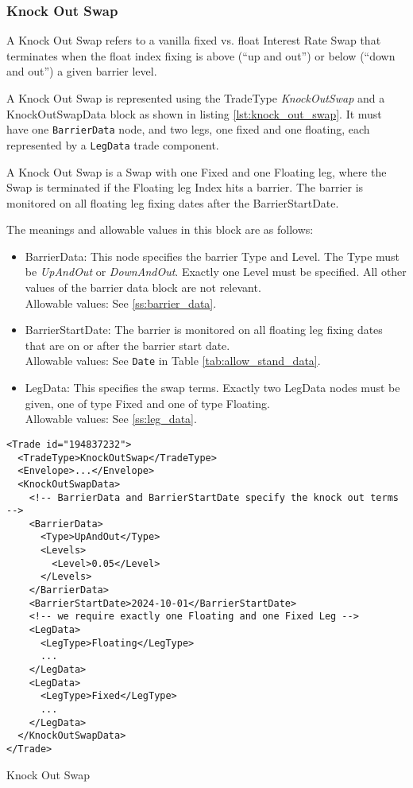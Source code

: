 \subsubsection{Knock Out Swap}

A Knock Out Swap refers to a vanilla fixed vs. float Interest Rate Swap that terminates when the float index fixing is above
(``up and out'') or below (``down and out'') a given barrier level.

A Knock Out Swap is represented using the TradeType \emph{KnockOutSwap} and a KnockOutSwapData block as shown in listing
\ref{lst:knock_out_swap}. It must have one \lstinline!BarrierData! node, and two legs, one fixed and one floating, each represented by a \lstinline!LegData! trade component. 

A Knock Out Swap is a Swap with one Fixed and one Floating leg, where the Swap is terminated if the Floating leg Index hits a barrier. The barrier is monitored on all floating leg fixing dates after the BarrierStartDate.

The meanings and allowable values in this block are as follows:

\begin{itemize}
\item BarrierData: This node specifies the barrier Type and Level. The Type must be \emph{UpAndOut} or
  \emph{DownAndOut}. Exactly one Level must be specified. All other values of the barrier data block are not relevant. \\
  Allowable values: See \ref{ss:barrier_data}.

\item BarrierStartDate: The barrier is monitored on all floating leg fixing dates that are on or after the barrier start date. \\
  Allowable values: See \lstinline!Date! in Table \ref{tab:allow_stand_data}.

\item LegData: This specifies the swap terms. Exactly two LegData nodes must be given, one of type Fixed and one of type Floating. \\
    Allowable values: See \ref{ss:leg_data}.
\end{itemize}

\begin{listing}[hbt]
\begin{verbatim}
<Trade id="194837232">
  <TradeType>KnockOutSwap</TradeType>
  <Envelope>...</Envelope>
  <KnockOutSwapData>
    <!-- BarrierData and BarrierStartDate specify the knock out terms -->
    <BarrierData>
      <Type>UpAndOut</Type>
      <Levels>
        <Level>0.05</Level>
      </Levels>
    </BarrierData>
    <BarrierStartDate>2024-10-01</BarrierStartDate>
    <!-- we require exactly one Floating and one Fixed Leg -->
    <LegData>
      <LegType>Floating</LegType>
      ...
    </LegData>
    <LegData>
      <LegType>Fixed</LegType>
      ...
    </LegData>
  </KnockOutSwapData>
</Trade>
\end{verbatim}
\caption{Knock Out Swap}
\label{lst:knock_out_swap}
\end{listing}
